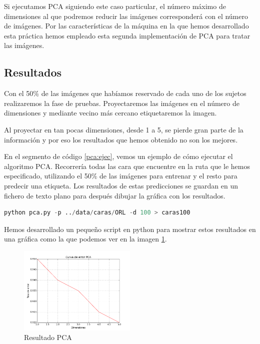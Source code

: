 Si ejecutamos PCA siguiendo este caso particular, el número máximo de dimensiones al que podremos reducir las imágenes corresponderá con el número de imágenes. Por las características de la máquina en la que hemos desarrollado esta práctica hemos empleado esta segunda implementación de PCA para tratar las imágenes. 

\subsection{Resultados}
Con el 50\% de las imágenes que habíamos reservado de cada uno de los sujetos realizaremos la fase de pruebas. Proyectaremos las imágenes en el número de dimensiones y mediante vecino más cercano etiquetaremos la imagen.\par 
Al proyectar en tan pocas dimensiones, desde 1 a 5, se pierde gran parte de la información y por eso los resultados que hemos obtenido no son los mejores.\par
En el segmento de código \ref{pca:ejec}, vemos un ejemplo de cómo ejecutar el algoritmo PCA. Recorrería todas las cara que encuentre en la ruta que le hemos especificado, utilizando el 50\% de las imágenes para entrenar y el resto para predecir una etiqueta. Los resultados de estas predicciones se guardan en un fichero de texto plano para después dibujar la gráfica con los resultados. \par

\begin{lstlisting}[language=python,label=pca:ejec, caption=Ejecución de PCA]
python pca.py -p ../data/caras/ORL -d 100 > caras100
\end{lstlisting}

Hemos desarrollado un pequeño script en python para mostrar estos resultados en una gráfica como la que podemos ver en la imagen \ref{fig:pca:resultados}.\par

\begin{figure}[h!]
  \centering
      \includegraphics[width=0.5\textwidth]{../pca/outputs/salida.png}
  \caption{ Resultado PCA}
  \label{fig:pca:resultados}
\end{figure} 


